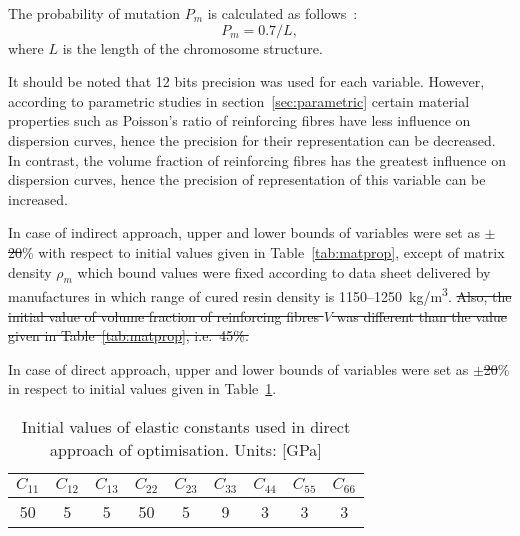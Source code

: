 \documentclass[preprint,12pt]{elsarticle}
\providecommand{\DIFaddtex}[1]{{\protect\color{blue}\uwave{#1}}} %
\providecommand{\DIFdeltex}[1]{{\protect\color{red}\sout{#1}}}                      %
\providecommand{\DIFaddbegin}{} %
\providecommand{\DIFaddend}{} %
\providecommand{\DIFdelbegin}{} %
\providecommand{\DIFdelend}{} %
\providecommand{\DIFadd}[1]{\texorpdfstring{\DIFaddtex{#1}}{#1}} %
\providecommand{\DIFdel}[1]{\texorpdfstring{\DIFdeltex{#1}}{}} %
\begin{document}
    The probability of mutation $P_m$ is calculated as follows~\cite{Chipperfield1994}:
    \begin{equation}
    	P_m = 0.7/L,
    \end{equation}
    where $L$ is the length of the chromosome structure.

    It should be noted that 12 bits precision was used for each variable. However, according to parametric studies in section~\ref{sec:parametric} certain material properties such as Poisson's ratio of reinforcing fibres have less influence on dispersion curves, hence the precision for their representation can be decreased. In contrast, the volume fraction of reinforcing fibres has the greatest influence on dispersion curves, hence the precision of representation of this variable can be increased.

	In case of indirect approach, upper and lower bounds of variables were set as $\pm$\DIFdelbegin \DIFdel{20}\DIFdelend \DIFaddbegin \DIFadd{50}\DIFaddend \% with respect to initial values given in Table~\ref{tab:matprop}, except of matrix density $\rho_m$ which bound values were fixed according to data sheet delivered by manufactures in which range of cured resin density is 1150--1250~kg/m\textsuperscript{3}. 
	\DIFdelbegin \DIFdel{Also, the initial value of volume fraction of reinforcing fibres $V$ was different than the value given in Table~\ref{tab:matprop},  i.e.~45\%.
	}\DIFdelend 

	In case of direct approach, upper and lower bounds of variables were set as  $\pm$\DIFdelbegin \DIFdel{20}\DIFdelend \DIFaddbegin \DIFadd{50}\DIFaddend \% in respect to initial values given in Table~\ref{tab:Ctensor_initial}.
	\DIFdelbegin %

\DIFdelend \begin{table}[h!]
		\renewcommand{\arraystretch}{1.3}
		\centering \footnotesize
		\caption{Initial values of elastic constants used in direct approach of optimisation. Units: [GPa]}
		\begin{tabular}{ccccccccc} 
			\toprule
			$C_{11}$ & $C_{12}$ & $C_{13}$  & $C_{22}$ & $C_{23}$ & $C_{33}$ & $C_{44}$  & $C_{55}$ & $C_{66}$ \\
			\midrule
			50 &5& 5&  50 & 5 & 9 & 3 & 3 & 3\\
			\bottomrule 
		\end{tabular} 
		\label{tab:Ctensor_initial}
	\end{table}
\end{document}

